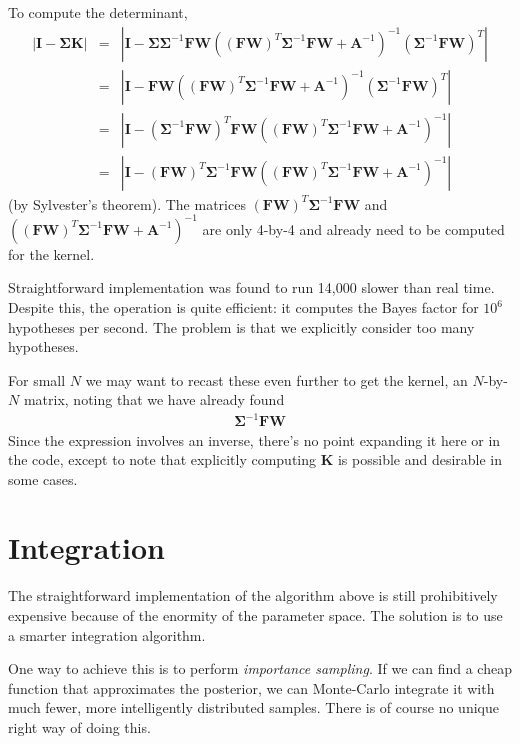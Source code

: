 \documentclass{article}
\begin{document}
To compute the determinant,
\begin{eqnarray}
|\mathbf{I}-\mathbf{\Sigma K}|&=&|\mathbf{I}-\mathbf{\Sigma}\mathbf{\Sigma}^{-1}\mathbf{FW}((\mathbf{FW})^T\mathbf{\Sigma}^{-1}\mathbf{FW}+\mathbf{A}^{-1})^{-1}(\mathbf{\Sigma}^{-1}\mathbf{FW})^T|\\
&=&|\mathbf{I}-\mathbf{FW}((\mathbf{FW})^T\mathbf{\Sigma}^{-1}\mathbf{FW}+\mathbf{A}^{-1})^{-1}(\mathbf{\Sigma}^{-1}\mathbf{FW})^T|\\
&=&|\mathbf{I}-(\mathbf{\Sigma}^{-1}\mathbf{FW})^T\mathbf{FW}((\mathbf{FW})^T\mathbf{\Sigma}^{-1}\mathbf{FW}+\mathbf{A}^{-1})^{-1}|\\
&=&|\mathbf{I}-(\mathbf{FW})^T\mathbf{\Sigma}^{-1}\mathbf{FW}((\mathbf{FW})^T\mathbf{\Sigma}^{-1}\mathbf{FW}+\mathbf{A}^{-1})^{-1}|
\end{eqnarray}
(by Sylvester's theorem).  The matrices $(\mathbf{FW})^T\mathbf{\Sigma}^{-1}\mathbf{FW}$ and $((\mathbf{FW})^T\mathbf{\Sigma}^{-1}\mathbf{FW}+\mathbf{A}^{-1})^{-1}$ are only 4-by-4 and already need to be computed for the kernel.

Straightforward implementation was found to run 14,000 slower than real time.  Despite this, the operation is quite efficient: it computes the Bayes factor for $10^6$ hypotheses per second.  The problem is that we explicitly consider too many hypotheses.

For small $N$ we may want to recast these even further to get the kernel, an $N$-by-$N$ matrix, noting that we have already found
\begin{eqnarray}
\mathbf{\Sigma}^{-1}\mathbf{FW}
\end{eqnarray}
Since the expression involves an inverse, there's no point expanding it here or in the code, except to note that explicitly computing $\mathbf{K}$ is possible and desirable in some cases.

\section{Integration}

The straightforward implementation of the algorithm above is still prohibitively expensive because of the enormity of the parameter space.  The solution is to use a smarter integration algorithm.

One way to achieve this is to perform \emph{importance sampling}.  If we can find a cheap function that approximates the posterior, we can Monte-Carlo integrate it with much fewer, more intelligently distributed samples.  There is of course no unique right way of doing this.
\end{document}
